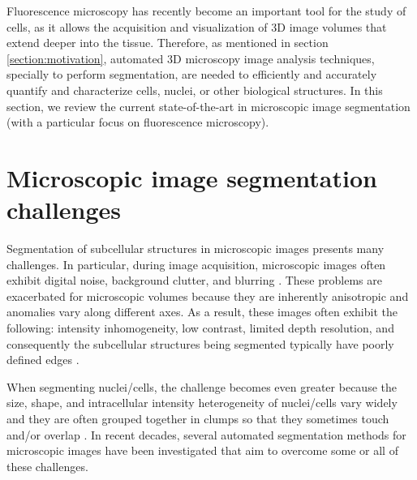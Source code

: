 \cleardoublepage
\label{chapter:state_of_the_art}

Fluorescence microscopy has recently become an important tool for the study of cells, as it allows the acquisition and visualization of \ac{3D} image volumes that extend deeper into the tissue. Therefore, as mentioned in section \ref{section:motivation}, automated \ac{3D} microscopy image analysis techniques, specially to perform segmentation, are needed to efficiently and accurately quantify and characterize cells, nuclei, or other biological structures. In this section, we review the current state-of-the-art in microscopic image segmentation (with a particular focus on fluorescence microscopy).


\section{Microscopic image segmentation challenges}

Segmentation of subcellular structures in microscopic images presents many challenges. In particular, during image acquisition, microscopic images often exhibit digital noise, background clutter, and blurring \cite{review:robust}. These problems are exacerbated for microscopic volumes because they are inherently anisotropic and anomalies vary along different axes. As a result, these images often exhibit the following: intensity inhomogeneity, low contrast, limited depth resolution, and consequently the subcellular structures being segmented typically have poorly defined edges \cite{active:inhmo}. 

When segmenting nuclei/cells, the challenge becomes even greater because the size, shape, and intracellular intensity heterogeneity of nuclei/cells vary widely and they are often grouped together in clumps so that they sometimes touch and/or overlap \cite{review:robust}. In recent decades, several automated segmentation methods for microscopic images have been investigated that aim to overcome some or all of these challenges.


